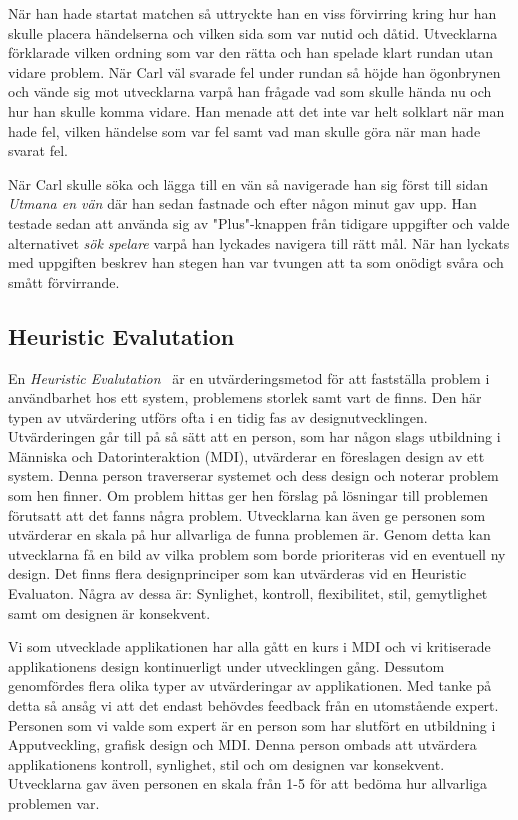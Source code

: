 \documentclass[a4paper, 11pt]{article}
\begin{document}
När han hade startat matchen så uttryckte han en viss förvirring kring hur han skulle placera händelserna och vilken sida som var nutid och dåtid. Utvecklarna förklarade vilken ordning som var den rätta och han spelade klart rundan utan vidare problem. När Carl väl svarade fel under rundan så höjde han ögonbrynen och vände sig mot utvecklarna varpå han frågade vad som skulle hända nu och hur han skulle komma vidare. Han menade att det inte var helt solklart när man hade fel, vilken händelse som var fel samt vad man skulle göra när man hade svarat fel.


När Carl skulle söka och lägga till en vän så navigerade han sig först till sidan \textit{Utmana en vän} där han sedan fastnade och efter någon minut gav upp. Han testade sedan att använda sig av "Plus"-knappen från tidigare uppgifter och valde alternativet \textit{sök spelare} varpå han lyckades navigera till rätt mål. När han lyckats med uppgiften beskrev han stegen han var tvungen att ta som onödigt svåra och smått förvirrande. 

\newpage
\subsection{Heuristic Evalutation}
En \textit{Heuristic Evalutation}~\cite[sid 228--229]{benyon2010designing} är en utvärderingsmetod för att fastställa problem i användbarhet hos ett system, problemens storlek samt vart de finns. Den här typen av utvärdering utförs ofta i en tidig fas av designutvecklingen. 
Utvärderingen går till på så sätt att en person, som har någon slags utbildning i Människa och Datorinteraktion (MDI), utvärderar en föreslagen design av ett system. Denna person traverserar systemet och dess design och noterar problem som hen finner. Om problem hittas ger hen förslag på lösningar till problemen förutsatt att det fanns några problem. Utvecklarna kan även ge personen som utvärderar en skala på hur allvarliga de funna problemen är. Genom detta kan utvecklarna få en bild av vilka problem som borde prioriteras vid en eventuell ny design. Det finns flera designprinciper som kan utvärderas vid en Heuristic Evaluaton. Några av dessa är: Synlighet, kontroll, flexibilitet, stil, gemytlighet samt om designen är konsekvent.

Vi som utvecklade applikationen har alla gått en kurs i MDI och vi kritiserade applikationens design kontinuerligt under utvecklingen gång. Dessutom genomfördes flera olika typer av utvärderingar av applikationen. Med tanke på detta så ansåg vi att det endast behövdes feedback från en utomstående expert. Personen som vi valde som expert är en person som har slutfört en utbildning i Apputveckling, grafisk design och MDI. 
Denna person ombads att utvärdera applikationens kontroll, synlighet, stil och om designen var konsekvent. Utvecklarna gav även personen en skala från 1-5 för att bedöma hur allvarliga problemen var.  
\end{document}
